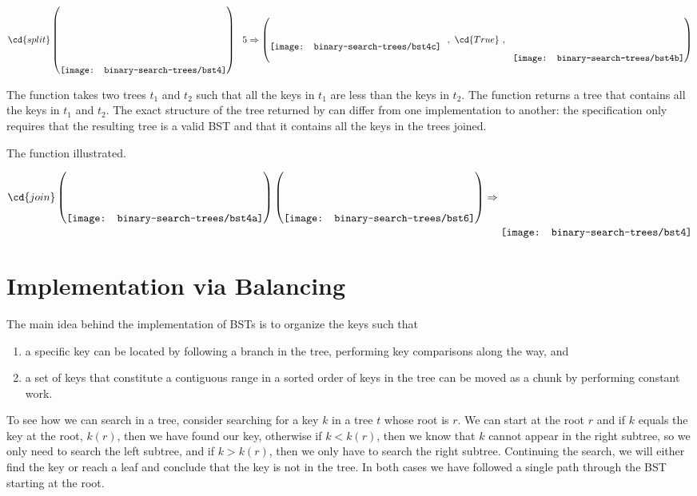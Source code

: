 \begin{chapter}
\begin{example}
\begin{itemize}
\[
\cd{split}
\left(
\raisebox{-.45in}{\texttt{[image: binary-search-trees/bst4]}}
\right) 
~~5
\Rightarrow 
\left(
\raisebox{-.1in}{\texttt{[image: binary-search-trees/bst4c]}}~~,
~\cd{True}~,~~
\raisebox{-.27in}{\texttt{[image: binary-search-trees/bst4b]}}
\right) 
\]
\end{itemize}
\end{example}

The function  takes two trees $t_1$ and $t_2$
such that all the keys in $t_1$ are less than the keys in $t_2$.  The
function returns a tree that contains all the keys in $t_1$ and $t_2$.
%
The exact structure of the tree returned by  can differ
from one implementation to another: the specification only requires
that the resulting tree is a valid BST and that it contains all the
keys in the trees joined.



\begin{example}
The function  illustrated.

\[
\cd{join}
\left(
\raisebox{-.27in}{\texttt{[image: binary-search-trees/bst4a]}}
\right)
\left(
\raisebox{-.27in}{\texttt{[image: binary-search-trees/bst6]}}
\right) 
\Rightarrow
\raisebox{-.45in}{\texttt{[image: binary-search-trees/bst4]}}
\]
\end{example}


\section{Implementation via Balancing}
\label{sec:bst::bsts-review}

The main idea behind the implementation of BSTs is to organize the
keys such that
\begin{enumerate}
\item
a specific key can be located by following a branch in the tree,
performing key comparisons along the way, and

\item a set of keys that constitute a contiguous range in a sorted
  order of keys in the tree can be moved as a chunk by performing
  constant work.
\end{enumerate}

To see how we can search in a tree, consider searching for a key $k$
in a tree $t$ whose root is $r$.
%
We can start at the root $r$ and if $k$ equals the key at the root,
$k(r)$, then we have found our key, otherwise if $k < k(r)$, then we
know that $k$ cannot appear in the right subtree, so we only need to
search the left subtree, and if $k > k(r)$, then we only have to
search the right subtree.  Continuing the search, we will either find
the key or reach a leaf and conclude that the key is not in the tree.
%
In both cases we have followed a single path through the BST starting
at the root.


\end{chapter}
